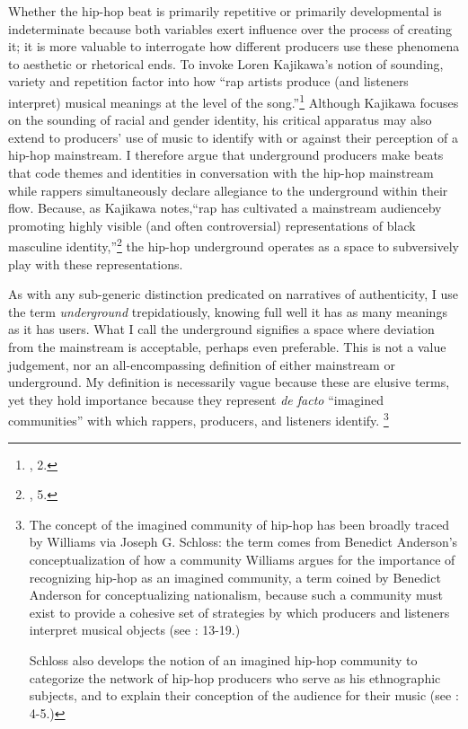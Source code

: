 Whether the hip-hop beat is primarily repetitive or primarily developmental is indeterminate because both variables exert influence over the process of creating it; it is more valuable to interrogate how different producers use these phenomena to aesthetic or rhetorical ends. To invoke Loren Kajikawa's notion of sounding, variety and repetition factor into how ``rap artists produce (and listeners interpret) musical meanings at the level of the song.''\footnote{\cite{lorenkajikawaSoundingRaceRap2015}, 2.} Although Kajikawa focuses on the sounding of racial and gender identity, his critical apparatus may also extend to producers' use of music to identify with or against their perception of a hip-hop mainstream. I therefore argue that underground producers make beats that code themes and identities in conversation with the hip-hop mainstream while rappers simultaneously declare allegiance to the underground within their flow. Because, as Kajikawa notes,``rap has cultivated a mainstream audience\textellipsis by promoting highly visible (and often controversial) representations of black masculine identity,''\footnote{\cite{lorenkajikawaSoundingRaceRap2015}, 5.} the hip-hop underground operates as a space to subversively play with these representations.

As with any sub-generic distinction predicated on narratives of authenticity, I use the term \emph{underground} trepidatiously, knowing full well it has as many meanings as it has users. What I call the underground signifies a space where deviation from the mainstream is acceptable, perhaps even preferable. This is not a value judgement, nor an all-encompassing definition of either mainstream or underground. My definition is necessarily vague because these are elusive terms, yet they hold importance because they represent \textit{de facto} ``imagined communities'' with which rappers, producers, and listeners identify.
\footnote{The concept of the imagined community of hip-hop has been broadly traced by Williams via Joseph G. Schloss: the term comes from Benedict Anderson's conceptualization of how a community Williams argues for the importance of recognizing hip-hop as an imagined community, a term coined by Benedict Anderson for conceptualizing nationalism, because such a community must exist to provide a cohesive set of strategies by which producers and listeners interpret musical objects (see \cite{justinawilliamsRhyminStealinMusical2013}: 13-19.) 

Schloss also develops the notion of an imagined hip-hop community to categorize the network of hip-hop producers who serve as his ethnographic subjects, and to explain their conception of the audience for their music (see \cite{josephgschlossMakingBeatsArt2004}: 4-5.)}

